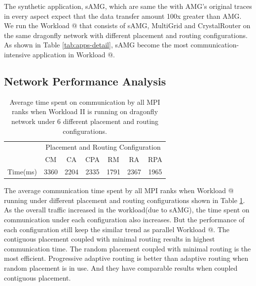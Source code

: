 \documentclass[conference,compsoc]{IEEEtran}
\makeatletter
\newcommand{\Rmnum}[1]{\expandafter\@slowromancap\romannumeral #1@}
\makeatother
\begin{document}
The synthetic application, sAMG, which are same the with AMG's original traces in every aspect expect that the data transfer amount 100x greater than AMG. We run the Workload \Rmnum{2 } that consists of sAMG, MultiGrid and CrystalRouter on the same dragonfly network with different placement and routing configurations. As shown in Table \ref{tab:apps-detail}, sAMG become the most communication-intensive application in Workload \Rmnum{2 }. 

\subsection{Network Performance Analysis}
\label{sec: workload-2 network analysis}

\begin{table}[ht]
\begin{center}
\caption{Average time spent on communication by all MPI ranks when Workload II is running on dragonfly network under 6 different placement and routing configurations.} 
\label{tab:syn-wkld-commtime}
\begin{tabular}{l c c c c c c }
\toprule %
\toprule
&\multicolumn{6}{c}{Placement and Routing Configuration} \\ %
\cmidrule(l){2-7}
	      & CM & CA & CPA & RM & RA & RPA \\ %
\midrule %
Time(ms)  & 3360 & 2204 & 2335 & 1791 & 2367 & 1965 \\ %

\midrule %
\bottomrule %
\end{tabular}
\end{center}
\end{table}


The average communication time spent by all MPI ranks when Workload \Rmnum{2} running under different placement and routing configurations shown in Table \ref{tab:syn-wkld-commtime}. As the overall traffic increased in the workload(due to sAMG), the time spent on communication under each configuration also increases. But the performance of each configuration still keep the similar trend as parallel Workload \Rmnum{1}. The contiguous placement coupled with minimal routing results in highest communication time. The random placement coupled with minimal routing is the most efficient. Progressive adaptive routing is better than adaptive routing when random placement is in use. And they have comparable results when coupled contiguous placement. 
\end{document}
